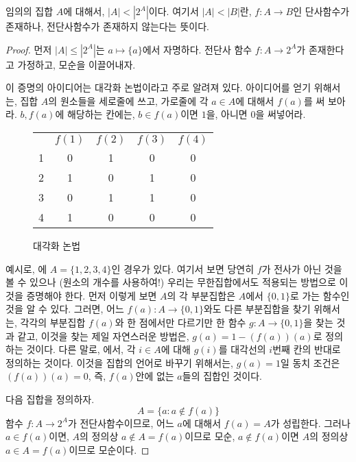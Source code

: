 \begin{theorem}[Cantor]
\label{thm:cantor}
    임의의 집합 $A$에 대해서, $|A| < |2^A|$이다.
    여기서 $|A| < |B|$란, $f: A \to B$인 단사함수가 존재하나, 전단사함수가 존재하지 않는다는 뜻이다.
\end{theorem}
\begin{proof}
    먼저 $|A| \leq |2^A|$는 $a \mapsto \{a\}$에서 자명하다.
    전단사 함수 $f: A \to 2^A$가 존재한다고 가정하고, 모순을 이끌어내자.
    
    이 증명의 아이디어는 대각화 논법이라고 주로 알려져 있다.
    아이디어를 얻기 위해서는, 집합 $A$의 원소들을 세로줄에 쓰고, 가로줄에 각 $a \in A$에 대해서 $f(a)$를 써 보아라.
    $b, f(a)$에 해당하는 칸에는, $b \in f(a)$이면 $1$을, 아니면 $0$을 써넣어라.
    \begin{figure}[ht]
        \centering
        \begin{tabular}{ccccc}
          & $f(1)$ & $f(2)$ & $f(3)$ & $f(4)$ \\
        1 & 0    & 1    & 0    & 0     \\
        2 & 1    & 0    & 1    & 0     \\
        3 & 0    & 1    & 1    & 0     \\
        4 & 1    & 0    & 0    & 0    
        \end{tabular}
        \caption{대각화 논법}
        \label{fig:diagtable}
    \end{figure}
    예시로, 에 $A = \{1,2,3,4\}$인 경우가 있다.
    여기서 보면 당연히 $f$가 전사가 아닌 것을 볼 수 있으나 (원소의 개수를 사용하여!) 우리는 무한집합에서도 적용되는 방법으로 이것을 증명해야 한다.
    먼저 이렇게 보면 $A$의 각 부분집합은 $A$에서 $\{0, 1\}$로 가는 함수인 것을 알 수 있다.
    그러면, 어느 $f(a): A \to \{0, 1\}$와도 다른 부분집합을 찾기 위해서는, 각각의 부분집합 $f(a)$와 한 점에서만 다르기만 한 함수 $g: A \to \{0, 1\}$을 찾는 것과 같고, 이것을 찾는 제일 자연스러운 방법은, $g(a) = 1 - (f(a))(a)$로 정의하는 것이다.
    다른 말로, 에서, 각 $i \in A$에 대해 $g(i)$를 대각선의 $i$번째 칸의 반대로 정의하는 것이다.
    이것을 집합의 언어로 바꾸기 위해서는, $g(a) = 1$일 동치 조건은 $(f(a))(a) = 0$, 즉, $f(a)$안에 없는 $a$들의 집합인 것이다.

    다음 집합을 정의하자.
    \begin{equation*}
        A = \{a : a \not\in f(a)\}
    \end{equation*}
    함수 $f: A \to 2^A$가 전단사함수이므로, 어느 $a$에 대해서 $f(a) = A$가 성립한다.
    그러나 $a \in f(a)$이면, $A$의 정의상 $a \not\in A = f(a)$이므로 모순, $a \not\in f(a)$이면 $A$의 정의상 $a \in A = f(a)$이므로 모순이다.
\end{proof}

